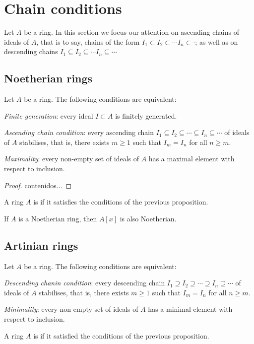 
\section{Chain conditions}

Let $A$ be a ring. In this section we focus our attention on ascending chains of ideals of $A$, that is to say, chains of the form $I_1 \subset I_2 \subset \cdots I_n \subset \cdot$; as well as on descending chains $I_1 \subseteq I_2 \subseteq \cdots I_n \subseteq \cdots $

\subsection{Noetherian rings}

\begin{prop}
	Let $A$ be a ring. The following conditions are equivalent:
	\begin{enumerateprop}
		\item \emph{Finite generation}: every ideal $I \subset A$ is finitely generated.
		\item \emph{Ascending chain condition}: every ascending chain $I_1 \subseteq I_2 \subseteq \cdots \subseteq I_n \subseteq \cdots$ of ideals of $A$ stabilises, that is, there exists $m \geq 1$ such that $I_m = I_n$ for all $n \geq m$.
		\item \emph{Maximality}: every non-empty set of ideals of $A$ has a maximal element with respect to inclusion.
	\end{enumerateprop}
\end{prop}
\begin{proof}
	contenidos...
\end{proof}

\begin{definition}
	A ring $A$ is  if it satisfies the conditions of the previous proposition.
\end{definition}


\begin{theorem}
	If $A$ is a Noetherian ring, then $A[x]$ is also Noetherian.
\end{theorem}

\subsection{Artinian rings}

\begin{prop}
	Let $A$ be a ring. The following conditions are equivalent:
	\begin{enumerateprop}
		\item \emph{Descending chanin condition}: every descending chain $I_1 \supseteq I_2 \supseteq \cdots \supseteq I_n \supseteq \cdots$ of ideals of $A$ stabilises, that is, there exists $m \geq 1$ such that $I_m = I_n$ for all $n \geq m$.
		\item \emph{Minimality}: every non-empty set of ideals of $A$ has a minimal element with respect to inclusion. 
	\end{enumerateprop}
\end{prop}

\begin{definition}
	A ring $A$ is  if it satisfied the conditions of the previous proposition.
\end{definition}




